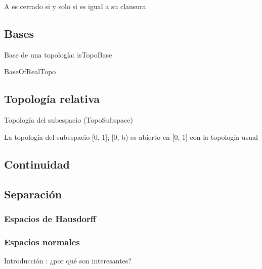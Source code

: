 \begin{proposition}
    A es cerrado si y solo si es igual a su clausura
\end{proposition}



\subsection{Bases}

\begin{definition}
  Base de una topología: isTopoBase
\end{definition}

\begin{example}
  BaseOfRealTopo
\end{example}

\subsection{Topología relativa}

\begin{definition}
  Topología del subespacio (TopoSubspace)
\end{definition}

\begin{example}
  La topología del subespacio [0, 1]; [0, b) es abierto en [0, 1] con la topología usual
\end{example}


\subsection{Continuidad}





\subsection{Separación}



\subsubsection{Espacios de Hausdorff}

\newpage
\subsubsection{Espacios normales}

Introducción : ¿por qué son interesantes?

